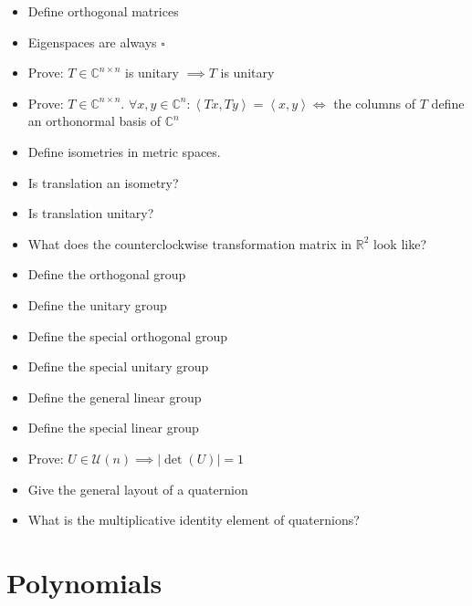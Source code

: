 \documentclass[a4paper]{article}
\newcommand{\ip}[2]{\left\langle#1,#2\right\rangle} %
\newcommand{\card}[1]{\left|#1\right|}
\begin{document}
\begin{itemize}
  \item Define orthogonal matrices
  \item Eigenspaces are always $\square{}$
  \item Prove: $T \in \mathbb C^{n \times n}$ is unitary $\implies T$ is unitary
  \item Prove: $T \in \mathbb C^{n \times n}$. $\forall x,y \in \mathbb C^n: \ip{Tx}{Ty} = \ip xy \iff$ the columns of $T$ define an orthonormal basis of $\mathbb C^n$
  \item Define isometries in metric spaces.
  \item Is translation an isometry?
  \item Is translation unitary?
  \item What does the counterclockwise transformation matrix in $\mathbb R^2$ look like?
  \item Define the orthogonal group
  \item Define the unitary group
  \item Define the special orthogonal group
  \item Define the special unitary group
  \item Define the general linear group
  \item Define the special linear group
  \item Prove: $U \in \mathcal U(n) \implies \card{\det(U)} = 1$
  \item Give the general layout of a quaternion
  \item What is the multiplicative identity element of quaternions?
\end{itemize}

\section{Polynomials}
\end{document}
